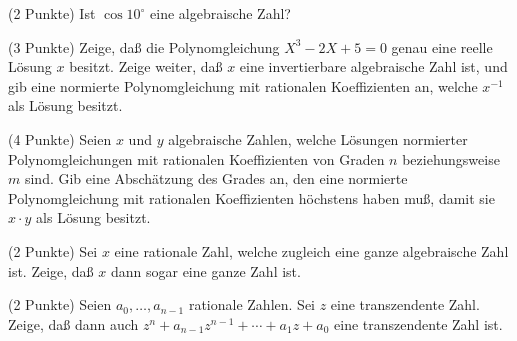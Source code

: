 \documentclass{algsheet}
\author{Dipl.-Math.~Franz Vogler}
\date{02.~November 2010}
\begin{document}
                \maketitle

\begin{exercise}(2 Punkte)\newline
 Ist \(\cos 10^\circ\) eine algebraische Zahl?
\end{exercise}





\begin{exercise}(3 Punkte)\newline
     Zeige, daß die Polynomgleichung \(X^3 - 2 X + 5 = 0\) genau eine reelle
    Lösung \(x\) besitzt. Zeige weiter, daß \(x\) eine invertierbare algebraische
    Zahl ist, und gib eine normierte Polynomgleichung mit rationalen
    Koeffizienten an, welche \(x^{-1}\) als Lösung besitzt.

\end{exercise}





\begin{exercise}(4 Punkte)\newline
    Seien \(x\) und \(y\) algebraische Zahlen, welche Lösungen normierter
    Polynomgleichungen mit rationalen Koeffizienten von Graden \(n\) beziehungsweise
    \(m\) sind. Gib eine Abschätzung des Grades an, den eine normierte
    Polynomgleichung mit rationalen Koeffizienten höchstens haben muß, damit sie
    \(x \cdot y\) als Lösung besitzt.
 \end{exercise}






\begin{exercise}
   (2 Punkte)\newline
    Sei \(x\) eine rationale Zahl, welche zugleich eine ganze algebraische Zahl
    ist. Zeige, daß \(x\) dann sogar eine ganze Zahl ist.
\end{exercise}




\begin{exercise}(2 Punkte)\newline
    Seien \(a_0, \dotsc, a_{n - 1}\) rationale Zahlen. Sei \(z\) eine
    transzendente Zahl. Zeige, daß dann auch \(z^n + a_{n - 1} z^{n - 1} +
    \dotsb + a_1 z + a_0\) eine transzendente Zahl ist.
\end{exercise}
\end{document}
